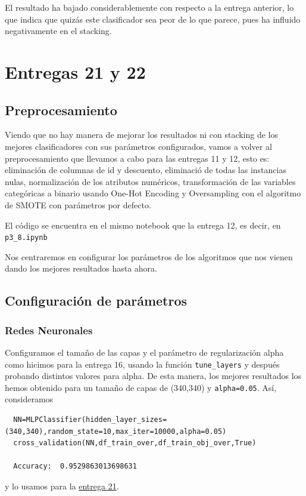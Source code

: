 \documentclass[a4paper,11pt]{article}
\begin{document}
  El resultado ha bajado considerablemente con respecto a la entrega anterior, lo que indica que quizás este clasificador sea peor de lo que parece, pues ha influido negativamente en el stacking. 
  
  \section{Entregas 21 y 22}
  \subsection{Preprocesamiento}
  
  Viendo que no hay manera de mejorar los resultados ni con stacking de los mejores clasificadores con sus parámetros configurados, vamos a volver al preprocesamiento que llevamos a cabo para las entregas 11 y 12, esto es: eliminación de columnas de id y descuento, eliminació de todas las instancias nulas, normalización de los atributos numéricos, transformación de las variables categóricas a binario usando One-Hot
  Encoding y Oversampling con el algoritmo de SMOTE con parámetros por defecto. 
  
  El código se encuentra en el mismo notebook que la entrega 12, es decir, en \texttt{p3_8.ipynb}
  
  Nos centraremos en configurar los parámetros de los algoritmos que nos vienen dando los mejores resultados hasta ahora. 
  \subsection{Configuración de parámetros}
  \subsubsection{Redes Neuronales}
  Configuramos el tamaño de las capas y el parámetro de regularización alpha como hicimos para la entrega 16, usando la función \texttt{tune_layers} y después probando distintos valores para alpha. De esta manera, los mejores resultados los hemos obtenido para un tamaño de capas de (340,340) y \texttt{alpha=0.05}. Así, consideramos 
  \begin{verbatim}
  NN=MLPClassifier(hidden_layer_sizes=(340,340),random_state=10,max_iter=10000,alpha=0.05)
  cross_validation(NN,df_train_over,df_train_obj_over,True)
  
  Accuracy:  0.9529863013698631
  \end{verbatim}
   y lo usamos para la \underline{entrega 21}.
  
\end{document}
